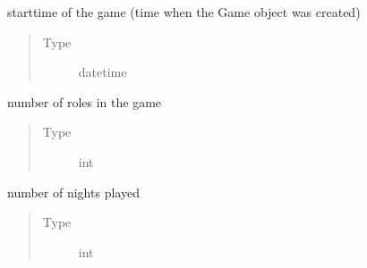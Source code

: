 \documentclass[letterpaper,10pt,english]{sphinxmanual}
\begin{document}
\begin{fulllineitems}
\begin{fulllineitems}
\begin{quote}
\begin{description}
\end{description}\end{quote}

\end{fulllineitems}


\begin{fulllineitems}
\label{\detokenize{chatwolf:chatwolf.game.Game.starttime}}
starttime of the game (time when the Game object was created)
\begin{quote}\begin{description}
\item[{Type}] \leavevmode
datetime

\end{description}\end{quote}

\end{fulllineitems}


\begin{fulllineitems}
\label{\detokenize{chatwolf:chatwolf.game.Game.num_roles}}
number of roles in the game
\begin{quote}\begin{description}
\item[{Type}] \leavevmode
int

\end{description}\end{quote}

\end{fulllineitems}


\begin{fulllineitems}
\label{\detokenize{chatwolf:chatwolf.game.Game.nn}}
number of nights played
\begin{quote}\begin{description}
\item[{Type}] \leavevmode
int

\end{description}\end{quote}


\end{fulllineitems}
\end{fulllineitems}
\end{document}
